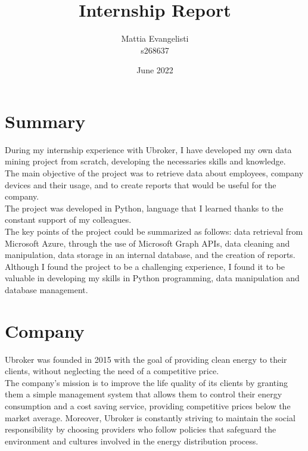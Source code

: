 \documentclass[12pt, a4paper, twoside]{article}
\title{\huge Internship Report}
\author{Mattia Evangelisti \\ s268637}
\date{June 2022}
\begin{document}
\begin{titlepage}
    \maketitle
\end{titlepage}

\tableofcontents
\clearpage\null\newpage

\newpage
\section{Summary}
During my internship experience with Ubroker, I have developed my own data mining project from scratch, developing the necessaries skills and knowledge.\\
The main objective of the project was to retrieve data about employees, company devices and their usage, and to create reports that would be useful for the company.\\
The project was developed in Python, language that I learned thanks to the constant support of my colleagues.\\
The key points of the project could be summarized as follows: data retrieval from Microsoft Azure, through the use of Microsoft Graph APIs, data cleaning and manipulation, data storage in an internal database,
and the creation of reports.\\
Although I found the project to be a challenging experience, I found it to be valuable in developing my skills in Python programming, data manipulation and database management.\\

\newpage
\section{Company}
Ubroker was founded in 2015 with the goal of providing clean energy to their clients, without neglecting the need of a competitive price.\\
The company's mission is to improve the life quality of its clients by granting them a simple management system that allows them to control their energy consumption and a cost saving service, providing 
competitive prices below the market average. Moreover, Ubroker is constantly striving to maintain the social responsibility by choosing providers who follow policies that safeguard the environment and cultures
involved in the energy distribution process.\\
\end{document}
